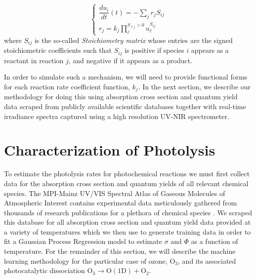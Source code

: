 \begin{equation}
  \begin{cases}
    \dfrac{d{u}_i}{dt}(t) = -\sum_j r_jS_{ij} \\
    r_j = k_j\prod\limits_{\ell}^{S_{\ell j}>0} u_{\ell}^{S_{ij}}
  \end{cases}
\end{equation}
where $S_{ij}$ is the so-called \textit{Stoichiometry matrix} whose entries are the signed stoichiometric coefficients such that $S_{ij}$ is positive if species $i$ appears as a reactant in reaction $j$, and negative if it appears as a product.

In order to simulate such a mechanism, we will need to provide functional forms for each reaction rate coefficient function, $k_j$. In the next section, we describe our methodology for doing this using absorption cross section and quantum yield data scraped from publicly available scientific databases together with real-time irradiance spectra captured using a high resolution UV-NIR spectrometer.

\section{Characterization of Photolysis}

To estimate the photolysis rates for photochemical reactions we must first collect data for the absorption cross section and quantum yields of all relevant chemical species. The MPI-Mainz UV/VIS Spectral Atlas of Gaseous Molecules of Atmospheric Interest contains experimental data meticulously gathered from thousands of research publications for a plethora of chemical species \cite{mpi-uvvis-database}. We scraped this database for all absorption cross section and quantum yield data provided at a variety of temperatures which we then use to generate training data in order to fit a Gaussian Process Regression model to estimate $\sigma$ and $\Phi$ as a function of temperature. For the remainder of this section, we will describe the machine learning methodology for the particular case of ozone, $\mathrm{O_3}$, and its associated photocatalytic dissociation $\mathrm{O}_3 \longrightarrow \mathrm{O(1D)} + \mathrm{O_2}$.



